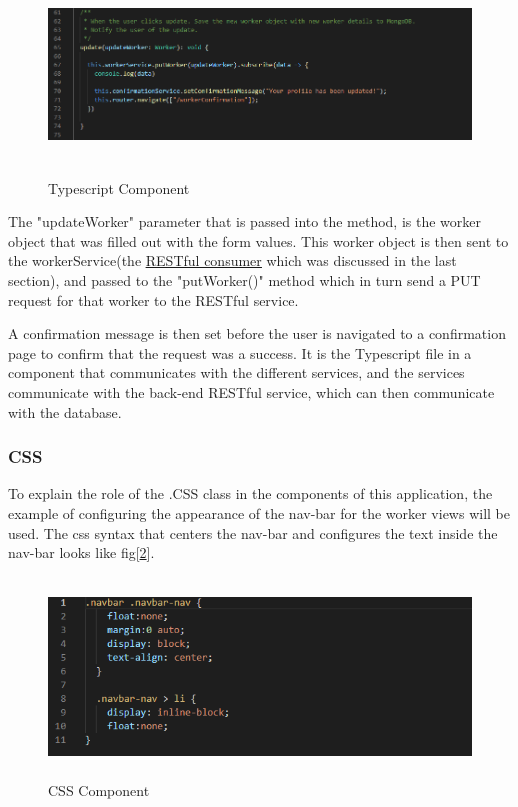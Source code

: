\begin{figure}[H]
    \centering
    \includegraphics[width=\textwidth, height=150pt]{DesignImages/edit-profileLogic.PNG}
    \caption{Typescript Component}
    \label{fig:tsComponent}
\end{figure}

\bigskip

The "updateWorker" parameter that is passed into the method, is the worker object that was filled out with the form values. This worker object is then sent to the workerService(the \hyperref[sec:SystemDesignRESTConsumers]{\underline{RESTful consumer}} which was discussed in the last section), and passed to the "putWorker()" method which in turn send a PUT request for that worker to the RESTful service. 

A confirmation message is then set before the user is navigated to a confirmation page to confirm that the request was a success. It is the Typescript file in a component that communicates with the different services, and the services communicate with the back-end RESTful service, which can then communicate with the database.

\subsubsection{CSS}
\label{sec:SystemDesignCSS}

To explain the role of the .CSS class in the components of this application, the example of configuring the appearance of the nav-bar for the worker views will be used. The css syntax that centers the nav-bar and configures the text inside the nav-bar looks like fig[\ref{fig:css}].

\begin{figure}[H]
    \centering
    \includegraphics[width=\textwidth, height=150pt]{DesignImages/edit-profileStyle.PNG}
    \caption{CSS Component}
    \label{fig:css}
\end{figure}

